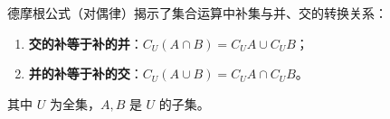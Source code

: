 \begin{statementbox}
德摩根公式（对偶律）揭示了集合运算中补集与并、交的转换关系：
\begin{enumerate}
    \item \textbf{交的补等于补的并}：$C_U(A \cap B) = C_U A \cup C_U B$；
    \item \textbf{并的补等于补的交}：$C_U(A \cup B) = C_U A \cap C_U B$。
\end{enumerate}
其中 $U$ 为全集，$A, B$ 是 $U$ 的子集。
\end{statementbox}